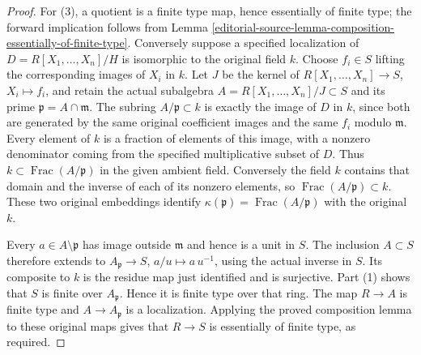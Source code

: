 \begin{proof}
For (3), a quotient is a finite type map, hence essentially of
finite type; the forward implication follows from
Lemma \ref{editorial-source-lemma-composition-essentially-of-finite-type}.
Conversely suppose a specified localization of
$D=R[X_1,\ldots,X_n]/H$ is isomorphic to the original field
$k$. Choose $f_i\in S$ lifting the corresponding images of
$X_i$ in $k$. Let $J$ be the kernel of
$R[X_1,\ldots,X_n]\to S$, $X_i\mapsto f_i$, and retain
the actual subalgebra
$A=R[X_1,\ldots,X_n]/J\subset S$ and its prime
$\mathfrak p=A\cap\mathfrak m$.
The subring $A/\mathfrak p\subset k$ is exactly the image
of $D$ in $k$, since both are generated by the same original
coefficient images and the same $f_i$ modulo $\mathfrak m$.
Every element of $k$ is a fraction of elements of this image,
with a nonzero denominator coming from the specified
multiplicative subset of $D$. Thus $k\subset
\operatorname{Frac}(A/\mathfrak p)$ in the given ambient field.
Conversely the field $k$ contains that domain and the inverse
of each of its nonzero elements, so
$\operatorname{Frac}(A/\mathfrak p)\subset k$.
These two original embeddings identify
$\kappa(\mathfrak p)=\operatorname{Frac}(A/\mathfrak p)$
with the original $k$.

Every $a\in A\setminus\mathfrak p$ has image outside
$\mathfrak m$ and hence is a unit in $S$. The inclusion
$A\subset S$ therefore extends to
$A_{\mathfrak p}\to S$, $a/u\mapsto a\,u^{-1}$,
using the actual inverse in $S$.
Its composite to $k$ is the residue map just identified and
is surjective. Part (1) shows that $S$ is finite over
$A_{\mathfrak p}$. Hence it is finite type over that ring.
The map $R\to A$ is finite type and $A\to A_{\mathfrak p}$
is a localization. Applying the proved composition lemma to
these original maps gives that $R\to S$ is essentially of
finite type, as required.
\end{proof}